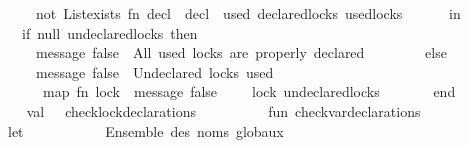 \begin{isabellebody}
\ \ \ \ \ \ \ \ \ \ not\ {\isacharparenleft}{\kern0pt}List{\isachardot}{\kern0pt}exists\ {\isacharparenleft}{\kern0pt}fn\ decl\ {\isacharequal}{\kern0pt}{\isachargreater}{\kern0pt}\ decl\ {\isacharequal}{\kern0pt}\ used{\isacharparenright}{\kern0pt}\ declared{\isacharunderscore}{\kern0pt}locks{\isacharparenright}{\kern0pt}{\isacharparenright}{\kern0pt}\ used{\isacharunderscore}{\kern0pt}locks\isanewline
\ \ \ \ \ \ in\isanewline
\ \ \ \ \ \ \ \ if\ null\ undeclared{\isacharunderscore}{\kern0pt}locks\ then\isanewline
\ \ \ \ \ \ \ \ \ \ message\ false\ {\isachardoublequote}{\kern0pt}{\isasymcheckmark}\ All\ used\ locks\ are\ properly\ declared{\isachardoublequote}{\kern0pt}\isanewline
\ \ \ \ \ \ \ \ else\isanewline
\ \ \ \ \ \ \ \ \ \ {\isacharparenleft}{\kern0pt}message\ false\ {\isachardoublequote}{\kern0pt}{\isasymcrossmark}\ Undeclared\ locks\ used{\isacharcolon}{\kern0pt}{\isachardoublequote}{\kern0pt}{\isacharsemicolon}{\kern0pt}\isanewline
\ \ \ \ \ \ \ \ \ \ \ map\ {\isacharparenleft}{\kern0pt}fn\ lock\ {\isacharequal}{\kern0pt}{\isachargreater}{\kern0pt}\ message\ false\ {\isacharparenleft}{\kern0pt}{\isachardoublequote}{\kern0pt}\ \ {\isachardoublequote}{\kern0pt}\ {\isacharcircum}{\kern0pt}\ lock{\isacharparenright}{\kern0pt}{\isacharparenright}{\kern0pt}\ undeclared{\isacharunderscore}{\kern0pt}locks{\isacharsemicolon}{\kern0pt}\ {\isacharparenleft}{\kern0pt}{\isacharparenright}{\kern0pt}{\isacharparenright}{\kern0pt}\isanewline
\ \ \ \ \ \ end\isanewline
\ \ \ \ \isanewline
\ \ \ \ val\ {\isacharunderscore}{\kern0pt}\ {\isacharequal}{\kern0pt}\ check{\isacharunderscore}{\kern0pt}lock{\isacharunderscore}{\kern0pt}declarations\ {\isacharparenleft}{\kern0pt}{\isacharparenright}{\kern0pt}\isanewline
\ \ \ \ \isanewline
\ \ \ \ fun\ check{\isacharunderscore}{\kern0pt}var{\isacharunderscore}{\kern0pt}declarations\ {\isacharparenleft}{\kern0pt}{\isacharparenright}{\kern0pt}\ {\isacharequal}{\kern0pt}\isanewline
\ \ \ \ \ \ let\isanewline
\ \ \ \ \ \ \ \ {\isacharparenleft}{\kern0pt}{\isacharasterisk}{\kern0pt}\ {\isacharminus}{\kern0pt}{\isacharminus}{\kern0pt}{\isacharminus}{\kern0pt}{\isacharminus}{\kern0pt}{\isacharminus}{\kern0pt}{\isacharminus}{\kern0pt}{\isacharminus}{\kern0pt}{\isacharminus}{\kern0pt}{\isacharminus}{\kern0pt}{\isacharminus}{\kern0pt}{\isacharminus}{\kern0pt}{\isacharminus}{\kern0pt}{\isacharminus}{\kern0pt}{\isacharminus}{\kern0pt}{\isacharminus}{\kern0pt}{\isacharminus}{\kern0pt}{\isacharminus}{\kern0pt}{\isacharminus}{\kern0pt}\ {}{\isachardot}{\kern0pt}\ Ensemble\ des\ noms\ globaux\ {\isacharminus}{\kern0pt}{\isacharminus}{\kern0pt}{\isacharminus}{\kern0pt}{\isacharminus}{\kern0pt}{\isacharminus}{\kern0pt}{\isacharminus}{\kern0pt}{\isacharminus}{\kern0pt}{\isacharminus}{\kern0pt}{\isacharminus}{\kern0pt}{\isacharminus}{\kern0pt}{\isacharminus}{\kern0pt}{\isacharminus}{\kern0pt}{\isacharminus}{\kern0pt}{\isacharminus}{\kern0pt}{\isacharminus}{\kern0pt}{\isacharminus}{\kern0pt}\ {\isacharasterisk}{\kern0pt}{\isacharparenright}{\kern0pt}\isanewline

\end{isabellebody}
